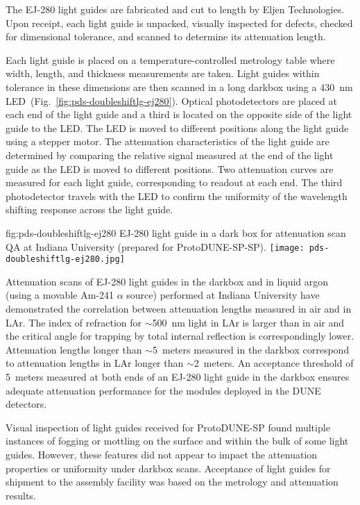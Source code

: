 The EJ-280 light guides are fabricated and cut to length by Eljen Technologies. Upon receipt, each light guide is unpacked, visually inspected for defects, checked for dimensional tolerance, and scanned to determine its attenuation length.

Each light guide is placed on a temperature-controlled metrology table where width, length, and thickness measurements are taken. Light guides within tolerance in these dimensions are then scanned in a long darkbox using a 430~nm LED~(Fig.~\ref{fig:pds-doubleshiftlg-ej280}). Optical photodetectors are placed at each end of the light guide and a third is located on the opposite side of the light guide to the LED. The LED is moved to different positions along the light guide using a stepper motor. The attenuation characteristics of the light guide are determined by comparing the relative signal measured at the end of the light guide as the LED is moved to different positions. Two attenuation curves are measured for each light guide, corresponding to readout at each end. The third photodetector travels with the LED to confirm the uniformity of the wavelength shifting response across the light guide.

\begin{dunefigure}{fig:pds-doubleshiftlg-ej280}
{EJ-280 light guide in a dark box for attenuation scan QA at Indiana University (prepared for ProtoDUNE-SP-SP).}
  \texttt{[image: pds-doubleshiftlg-ej280.jpg]}
\end{dunefigure}

Attenuation scans of EJ-280 light guides in the darkbox and in liquid argon (using a movable Am-241 $\alpha$ source) performed at Indiana University have demonstrated the correlation between attenuation lengths measured in air and in LAr. The index of refraction for $\sim$500~nm light in LAr is larger than in air and the critical angle for trapping by total internal reflection is correspondingly lower. Attenuation lengths longer than $\sim$5~meters measured in the darkbox correspond to attenuation lengths in LAr longer than $\sim$2~meters. An acceptance threshold of 5~meters measured at both ends of an EJ-280 light guide in the darkbox ensures adequate attenuation performance for the modules deployed in the DUNE detectors.

Visual inspection of light guides received for ProtoDUNE-SP found multiple instances of fogging or mottling on the surface and within the bulk of some light guides. However, these features did not appear to impact the attenuation properties or uniformity under darkbox scans. Acceptance of light guides for shipment to the assembly facility was based on the metrology and attenuation results.

